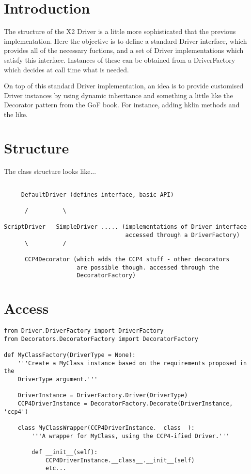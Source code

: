 \documentclass[a4paper, 11pt]{article}
\begin{document}
\section{Introduction}

The structure of the X2 Driver is a little more sophisticated that the
previous implementation. Here the objective is to define a standard Driver
interface, which provides all of the necessary fuctions, and a set of 
Driver implementations which satisfy this interface. Instances of these
can be obtained from a DriverFactory which decides at call time what is needed.

On top of this standard Driver implementation, an idea is to provide
customised Driver instances by using dynamic inheritance and something a
little like the Decorator pattern from the GoF book. For instance, adding
hklin methods and the like.

\section{Structure}

The class structure looks like...

{
\tiny
\begin{verbatim}

     DefaultDriver (defines interface, basic API)

      /          \

ScriptDriver   SimpleDriver ..... (implementations of Driver interface
                                   accessed through a DriverFactory)
      \          /

      CCP4Decorator (which adds the CCP4 stuff - other decorators 
                     are possible though. accessed through the 
                     DecoratorFactory)

\end{verbatim}
}

\section{Access}

{
\tiny
\begin{verbatim}
from Driver.DriverFactory import DriverFactory
from Decorators.DecoratorFactory import DecoratorFactory

def MyClassFactory(DriverType = None):
    '''Create a MyClass instance based on the requirements proposed in the
    DriverType argument.'''

    DriverInstance = DriverFactory.Driver(DriverType)
    CCP4DriverInstance = DecoratorFactory.Decorate(DriverInstance, 'ccp4')

    class MyClassWrapper(CCP4DriverInstance.__class__):
        '''A wrapper for MyClass, using the CCP4-ified Driver.'''

        def __init__(self):
            CCP4DriverInstance.__class__.__init__(self)
            etc...
\end{verbatim}
}
\end{document}

